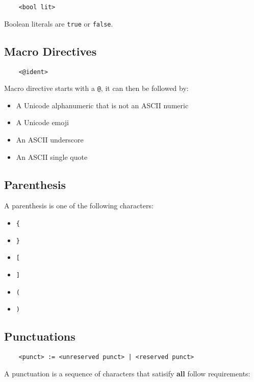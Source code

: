 \documentclass[a4paper]{article}
\begin{document}
\begin{verbatim}
    <bool lit>
\end{verbatim}

Boolean literals are \verb|true| or \verb|false|.

\subsection{Macro Directives}

\begin{verbatim}
    <@ident>
\end{verbatim}

Macro directive starts with a \verb|@|, it can then be followed by:

\begin{itemize}
    \item A Unicode alphanumeric that is not an ASCII numeric
    \item A Unicode emoji
    \item An ASCII underscore
    \item An ASCII single quote
\end{itemize}

\subsection{Parenthesis}

A parenthesis is one of the following characters:

\begin{itemize}
    \item \verb|{|
    \item \verb|}|
    \item \verb|[|
    \item \verb|]|
    \item \verb|(|
    \item \verb|)|
\end{itemize}

\subsection{Punctuations}

\begin{verbatim}
    <punct> := <unreserved punct> | <reserved punct>
\end{verbatim}

A punctuation is a sequence of characters that satisify {\bf all} follow requirements:
\end{document}

